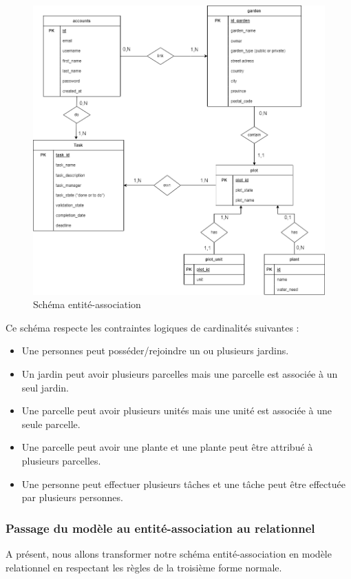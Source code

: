 \documentclass[french,a4paper]{article}
\begin{document}
\begin{figure}[H]
    \centering
    \includegraphics[width=1\textwidth]{img/Schema_entite_association_PPIIversion2.drawio.png}
    \caption{Schéma entité-association}
\end{figure}

Ce schéma respecte les contraintes logiques de cardinalités suivantes : 

\begin{itemize}
    \item Une personnes peut posséder/rejoindre un ou plusieurs jardins.
    \item Un jardin peut avoir plusieurs parcelles mais une parcelle est associée à un seul jardin.
    \item Une parcelle peut avoir plusieurs unités mais une unité est associée à une seule parcelle.
    \item Une parcelle peut avoir une plante et une plante peut être attribué à plusieurs parcelles.
    \item Une personne peut effectuer plusieurs tâches et une tâche peut être effectuée par plusieurs personnes.
\end{itemize}

\subsubsection{Passage du modèle au entité-association au relationnel}
A présent, nous allons transformer notre schéma entité-association en modèle relationnel en respectant les règles de la troisième forme
normale.
\end{document}
